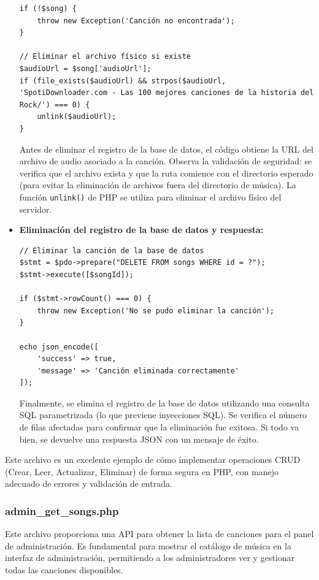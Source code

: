 \documentclass[a4paper,12pt]{article}
\begin{document}
\begin{itemize}
\begin{verbatim}
if (!$song) {
    throw new Exception('Canción no encontrada');
}

// Eliminar el archivo físico si existe
$audioUrl = $song['audioUrl'];
if (file_exists($audioUrl) && strpos($audioUrl, 'SpotiDownloader.com - Las 100 mejores canciones de la historia del Rock/') === 0) {
    unlink($audioUrl);
}
    \end{verbatim}
    Antes de eliminar el registro de la base de datos, el código obtiene la URL del archivo de audio asociado a la canción. Observa la validación de seguridad: se verifica que el archivo exista y que la ruta comience con el directorio esperado (para evitar la eliminación de archivos fuera del directorio de música). La función \texttt{unlink()} de PHP se utiliza para eliminar el archivo físico del servidor.
    
    \item \textbf{Eliminación del registro de la base de datos y respuesta:}
    \begin{verbatim}
// Eliminar la canción de la base de datos
$stmt = $pdo->prepare("DELETE FROM songs WHERE id = ?");
$stmt->execute([$songId]);

if ($stmt->rowCount() === 0) {
    throw new Exception('No se pudo eliminar la canción');
}

echo json_encode([
    'success' => true,
    'message' => 'Canción eliminada correctamente'
]);
    \end{verbatim}
    Finalmente, se elimina el registro de la base de datos utilizando una consulta SQL parametrizada (lo que previene inyecciones SQL). Se verifica el número de filas afectadas para confirmar que la eliminación fue exitosa. Si todo va bien, se devuelve una respuesta JSON con un mensaje de éxito.
\end{itemize}

Este archivo es un excelente ejemplo de cómo implementar operaciones CRUD (Crear, Leer, Actualizar, Eliminar) de forma segura en PHP, con manejo adecuado de errores y validación de entrada.

\subsubsection{admin\_get\_songs.php}

Este archivo proporciona una API para obtener la lista de canciones para el panel de administración. Es fundamental para mostrar el catálogo de música en la interfaz de administración, permitiendo a los administradores ver y gestionar todas las canciones disponibles.
\end{document}
